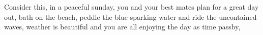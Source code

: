 Consider this, in a peaceful sunday, you and your best mates plan for a great day out, bath on the beach, peddle the blue sparking water and ride the uncontained waves, weather is beautiful and you are all enjoying the day as time passby, 